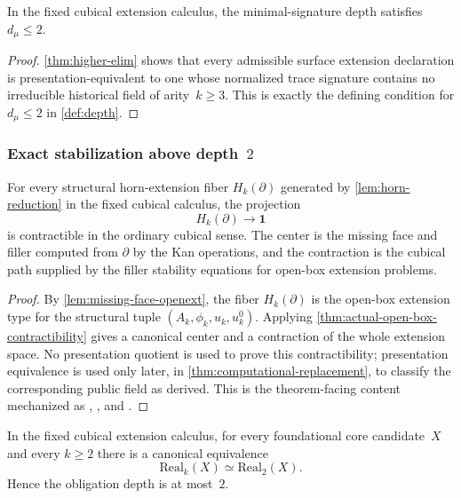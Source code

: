 \documentclass{lmcs}
\newcommand{\Real}{\mathrm{Real}}
\begin{document}
\begin{cor}
\label{cor:dmu2}
In the fixed cubical extension calculus, the minimal-signature depth satisfies $d_\mu \leq 2$.
\end{cor}

\begin{proof}
\autoref{thm:higher-elim} shows that every admissible surface extension declaration is presentation-equivalent to one whose normalized trace signature contains no irreducible historical field of arity~$k \geq 3$. This is exactly the defining condition for $d_\mu \leq 2$ in \autoref{def:depth}.
\end{proof}

\subsubsection{\texorpdfstring{Exact stabilization above depth~$2$}{Exact stabilization above depth 2}}

\begin{lem}
\label{lem:kan-horn-contract}
For every structural horn-extension fiber $H_k(\partial)$ generated by
\autoref{lem:horn-reduction} in the fixed cubical calculus, the projection
\[
  H_k(\partial)\to\mathbf{1}
\]
is contractible in the ordinary cubical sense. The center is the missing face
and filler computed from $\partial$ by the Kan operations, and the contraction
is the cubical path supplied by the filler stability equations for open-box
extension problems.
\end{lem}

\begin{proof}
By \autoref{lem:missing-face-openext}, the fiber $H_k(\partial)$ is the
open-box extension type for the structural tuple
$(A_k,\phi_k,u_k,u^0_k)$. Applying
\autoref{thm:actual-open-box-contractibility} gives a canonical center and a
contraction of the whole extension space. No presentation quotient is used to
prove this contractibility; presentation equivalence is used only later, in
\autoref{thm:computational-replacement}, to classify the corresponding public
field as derived. This is the theorem-facing content mechanized as
, , and
.
\end{proof}

\begin{thm}
\label{thm:upper}
\label{thm:primitive-depth-upper-bound}
In the fixed cubical extension calculus, for every foundational core candidate~$X$ and every $k \geq 2$ there is a canonical equivalence
\[
  \Real_k(X) \simeq \Real_2(X).
\]
Hence the obligation depth is at most~$2$.
\end{thm}
\end{document}
